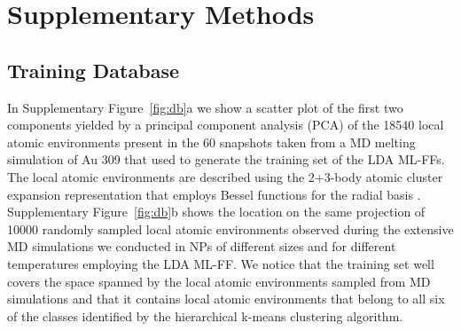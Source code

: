 \documentclass[%
aip,
 amsmath,amssymb,
 reprint,
]{revtex4-1}
\begin{document}
\section*{Supplementary Methods}
\subsection*{Training Database}
%
In Supplementary Figure~\ref{fig:db}a we show a scatter plot of the first two components yielded by a principal component analysis (PCA) of the 18540 local atomic environments present in the 60 snapshots taken from a MD melting simulation of Au 309 that used to generate the training set of the LDA ML-FFs.
%
The local atomic environments are described using the 2+3-body atomic cluster expansion representation that employs Bessel functions for the radial basis \cite{Drautz2019, Zeni2021}.
%
Supplementary Figure~\ref{fig:db}b shows the location on the same projection of 10000 randomly sampled local atomic environments observed during the extensive MD simulations we conducted in NPs of different sizes and for different temperatures employing the LDA ML-FF.
%
We notice that the training set well covers the space spanned by the local atomic environments sampled from MD simulations and that it contains local atomic environments that belong to all six of the classes identified by the hierarchical k-means clustering  algorithm.
%
\end{document}
